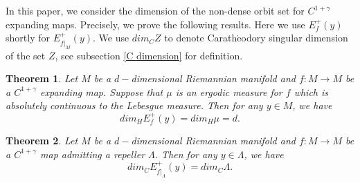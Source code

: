 \documentclass[11pt,a4paper]{amsart}
\theoremstyle{plain}
\newtheorem{Main}{Theorem}
\theoremstyle{remark}
\def\W{\operatorname{W}}
\begin{document}
	In this paper, we consider the  dimension of the non-dense orbit set for $C^{1+\gamma}$ expanding maps. Precisely, we prove the following results. Here we use $E^{+}_{f}(y)$ shortly for $E^{+}_{f|_{M}}(y)$. We use $dim_C Z$ to denote Carath$\acute{\text{e}}$odory singular dimension of the set $Z$, see subsection \ref{C dimension} for definition.
	\begin{Main}\label{expanding}
		Let $M$ be a $d-$dimensional Riemannian manifold and $f: M\rightarrow M$ be a $C^{1+\gamma}$ expanding map. Suppose that $\mu$ is an ergodic measure for $f$ which is absolutely continuous to the Lebesgue measure. Then for any $y\in M$, we have $$dim_{H} E^{+}_{f}(y)=dim_{H}\mu=d.$$
	\end{Main}
	\begin{Main}\label{expanding2}
		Let $M$ be a $d-$dimensional Riemannian manifold and $f: M\rightarrow M$ be a $C^{1+\gamma}$ map admitting a repeller $\Lambda$. Then for any $y\in \Lambda$, we have $$dim_{C} E^{+}_{f|_{\Lambda}}(y)=dim_{C} \Lambda.$$
	\end{Main}

\end{document}
